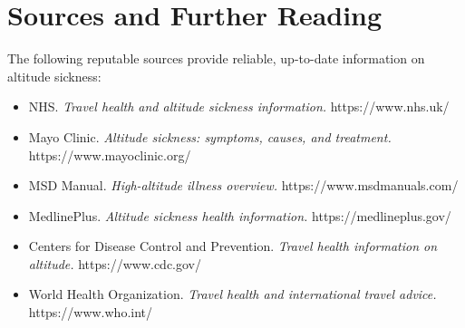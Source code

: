 \section*{Sources and Further Reading}
The following reputable sources provide reliable, up-to-date information on altitude sickness:

\begin{itemize}
    \item NHS. \textit{Travel health and altitude sickness information.} https://www.nhs.uk/
    \item Mayo Clinic. \textit{Altitude sickness: symptoms, causes, and treatment.} https://www.mayoclinic.org/
    \item MSD Manual. \textit{High-altitude illness overview.} https://www.msdmanuals.com/
    \item MedlinePlus. \textit{Altitude sickness health information.} https://medlineplus.gov/
    \item Centers for Disease Control and Prevention. \textit{Travel health information on altitude.} https://www.cdc.gov/
    \item World Health Organization. \textit{Travel health and international travel advice.} https://www.who.int/
\end{itemize}
